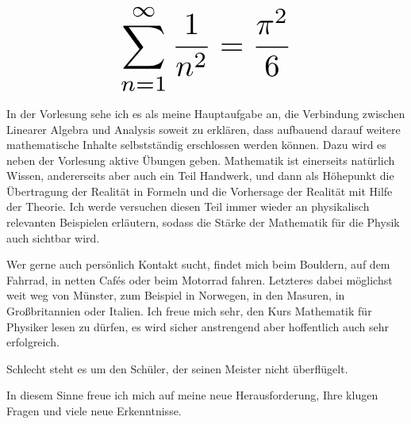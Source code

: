 \begin{multicols}{2}
\[
\resizebox{0.45\hsize}{!}{$\displaystyle\sum_{n = 1}^\infty \frac{1}{n^2} = \frac{\pi^2}{6}$}
\]

In der Vorlesung sehe ich es als meine Hauptaufgabe an, die Verbindung zwischen Linearer Algebra und Analysis soweit zu erklären, dass aufbauend darauf weitere mathematische Inhalte selbstständig erschlossen werden können. Dazu wird es neben der Vorlesung aktive Übungen geben. Mathematik ist einerseits natürlich Wissen, andererseits aber auch ein Teil Handwerk, und dann als Höhepunkt die Übertragung der Realität in Formeln und die Vorhersage der Realität mit Hilfe der Theorie. Ich werde versuchen diesen Teil immer wieder an physikalisch relevanten Beispielen erläutern, sodass die Stärke der Mathematik für die Physik auch sichtbar wird.

Wer gerne auch persönlich Kontakt sucht, findet mich beim Bouldern, auf dem Fahrrad, in netten Cafés oder beim Motorrad fahren. Letzteres dabei möglichst weit weg von Münster, zum Beispiel in Norwegen, in den Masuren, in Großbritannien oder Italien. Ich freue mich sehr, den Kurs Mathematik für Physiker lesen zu dürfen, es wird sicher anstrengend aber hoffentlich auch sehr erfolgreich.

Schlecht steht es um den Schüler, der seinen Meister nicht überflügelt.

In diesem Sinne freue ich mich auf meine neue Herausforderung, Ihre klugen Fragen und viele neue Erkenntnisse.

\begin{center}
\end{center}

\end{multicols}

